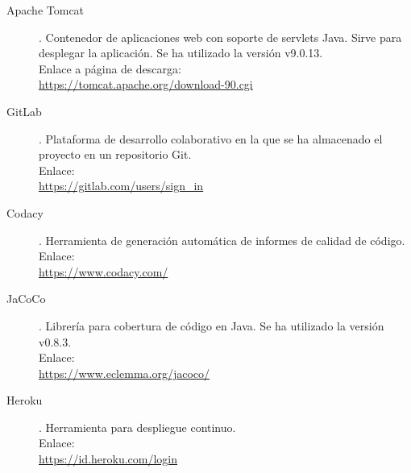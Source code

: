 \begin{description}
	\item[Apache Tomcat]. Contenedor de aplicaciones web con soporte de servlets Java. Sirve para desplegar la aplicación. Se ha utilizado la versión  v9.0.13.\\ Enlace a página de descarga:\\ \url{https://tomcat.apache.org/download-90.cgi}
	\item[GitLab]. Plataforma de desarrollo colaborativo en la que se ha almacenado el proyecto en un repositorio Git.\\ Enlace:\\ \url{https://gitlab.com/users/sign_in}
	\item[Codacy]. Herramienta de generación automática de informes de calidad de código.\\ Enlace:\\ \url{https://www.codacy.com/}
	\item[JaCoCo]. Librería para cobertura de código en Java. Se ha utilizado la versión v0.8.3.\\ Enlace:\\ \url{https://www.eclemma.org/jacoco/}
	\item[Heroku]. Herramienta para despliegue continuo.\\ Enlace:\\ \url{https://id.heroku.com/login}
\end{description}
